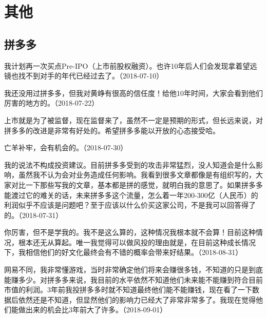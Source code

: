 
\section{其他}

\subsection{拼多多}


我计划再一次买点Pre-IPO（上市前股权融资）。也许10年后人们会发现拿着望远镜也找不到对手的年代已经过去了。（2018-07-10）

我还没用过拼多多，但我对黄峥有很高的信任度！给他10年时间，大家会看到他们厉害的地方的。（2018-07-22）


上市就是为了被监督，现在监督来了，虽然不一定是预期的形式，但长远来说，对拼多多的改进是非常有好处的。希望拼多多能以开放的心态接受哈。

亡羊补牢，会有机会的。（2018-07-30）


我的说法不构成投资建议。目前拼多多受到的攻击非常猛烈，没人知道会是什么影响，虽然我不认为会对业务造成任何影响。我看到很多文章都像是有组织写的，大家对比一下那些写我的文章，基本都是拼的感觉，就明白我的意思了。如果拼多多能渡过它的难关的话，未来拼多多这个流量，怎么着一年200-300亿（人民币）的利润似乎不应该是问题吧？至于应该以什么价买这家公司，不是我可以回答得了的。（2018-07-31）


你厉害，但不是学我的。我不是这么算的，这种情况我根本就不会算！目前这种情况，根本还无从算起。唯一我觉得可以做风投的理由就是，在目前这种成长情况下，我相信他们的好文化最终会有不错的概率会带来好结果。（2018-08-31）


网易不同，我非常懂游戏，当时非常确定他们将来会赚很多钱，不知道的只是到底能赚多少。对拼多多来说，我目前的水平依然不知道他们未来能不能赚到符合目前市值的利润。3年前我投拼多多时就不知道最终他们能不能赚钱，现在看了一下数据后依然还是不知道，但显然他们的影响力已经大了非常非常多了。我现在觉得他们能做出来的机会比3年前大了许多。（2018-09-01）


